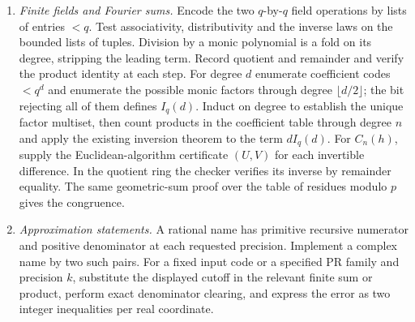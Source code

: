 \begin{enumerate}
division. Polynomial cyclotomic arguments use lists with the explicitly
given degree bound, monic division with remainder, and equality of
coefficients. Finite geometric sums are first proved by recursion on
their length, so evaluating at a unit in a specified quotient ring
uses only addition and multiplication of integer pairs or lists.
For the irreducible count over a field of cardinality $q$, supply two
$q$-by-$q$ operation tables and validate the field axioms by a bounded
scan. Represent a monic of degree $n$ by the base-$q$ digits of a number
less than $q^n$. For $n>0$ its irreducibility bit tests every monic
divisor of degree $1$ through $\lfloor n/2\rfloor$ by remainder.
Summing this bit gives $I_q(n)$. If a division splits a polynomial of
positive degree, both new degrees decrease. Recursion through a coded
list, with sum of the pending degrees bounded by $n$, gives a complete
factor list in at most $2n-1$ node visits. Use the Euclidean B\'ezout
identity to prove Euclid's lemma for monic irreducibles, then compare
multiplicities. This supplies the factorization bijection used by the
finite Euler product.
\item \emph{Finite fields and Fourier sums.} Encode the two $q$-by-$q$
field operations by lists of entries $<q$. Test associativity, distributivity
and the inverse laws on the bounded lists of tuples. Division by a monic
polynomial is a fold on its degree, stripping the leading term. Record
quotient and remainder and verify the product identity at each step.
For degree $d$ enumerate coefficient codes $<q^d$ and enumerate the
possible monic factors through degree $\lfloor d/2\rfloor$; the bit
rejecting all of them defines $I_q(d)$. Induct on degree to establish
the unique factor multiset, then count products in the coefficient table
through degree $n$ and apply the existing inversion theorem to the term
$d I_q(d)$. For $C_n(h)$, supply the Euclidean-algorithm certificate
$(U,V)$ for each invertible difference. In the quotient ring the checker
verifies its inverse by remainder equality. The same geometric-sum proof
over the table of residues modulo $p$ gives the congruence.
\item \emph{Approximation statements.} A rational name has primitive
recursive numerator and positive denominator at each requested precision.
Implement a complex name by two such pairs. For a fixed input code or a
specified PR family and precision $k$, substitute the displayed cutoff in
the relevant finite sum or product, perform exact denominator clearing,
and express the error as two integer inequalities per real coordinate.

\end{enumerate}
